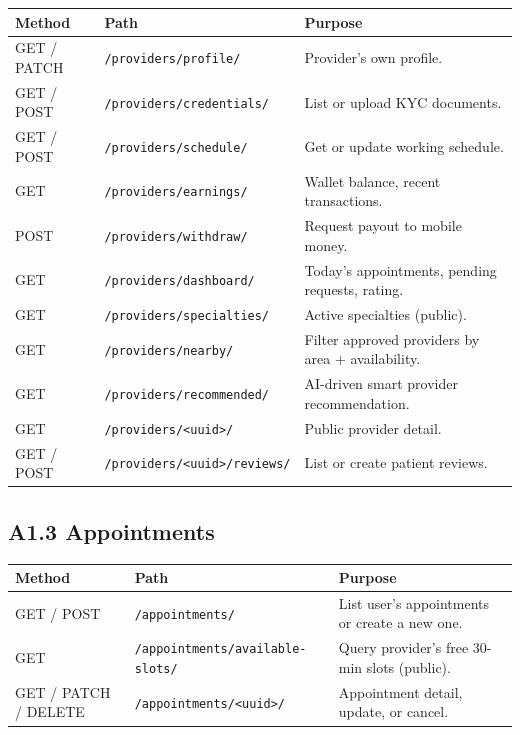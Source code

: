\begin{longtable}{|p{1.4cm}|p{6.5cm}|p{6.0cm}|}
\hline
\textbf{Method} & \textbf{Path} & \textbf{Purpose} \\ \hline

\endhead
GET / PATCH & \texttt{/providers/profile/}                 & Provider's own profile. \\ \hline
GET / POST  & \texttt{/providers/credentials/}             & List or upload KYC documents. \\ \hline
GET / POST  & \texttt{/providers/schedule/}                & Get or update working schedule. \\ \hline
GET         & \texttt{/providers/earnings/}                & Wallet balance, recent transactions. \\ \hline
POST        & \texttt{/providers/withdraw/}                & Request payout to mobile money. \\ \hline
GET         & \texttt{/providers/dashboard/}               & Today's appointments, pending requests, rating. \\ \hline
GET         & \texttt{/providers/specialties/}             & Active specialties (public). \\ \hline
GET         & \texttt{/providers/nearby/}                  & Filter approved providers by area + availability. \\ \hline
GET         & \texttt{/providers/recommended/}             & AI-driven smart provider recommendation. \\ \hline
GET         & \texttt{/providers/<uuid>/}                  & Public provider detail. \\ \hline
GET / POST  & \texttt{/providers/<uuid>/reviews/}          & List or create patient reviews. \\ \hline

\end{longtable}

\subsection*{A1.3 Appointments}

\begin{longtable}{|p{1.4cm}|p{6.5cm}|p{6.0cm}|}
\hline
\textbf{Method} & \textbf{Path} & \textbf{Purpose} \\ \hline

\endhead
GET / POST              & \texttt{/appointments/}                 & List user's appointments or create a new one. \\ \hline
GET                     & \texttt{/appointments/available-slots/} & Query provider's free 30-min slots (public). \\ \hline
GET / PATCH / DELETE    & \texttt{/appointments/<uuid>/}          & Appointment detail, update, or cancel. \\ \hline

\end{longtable}

